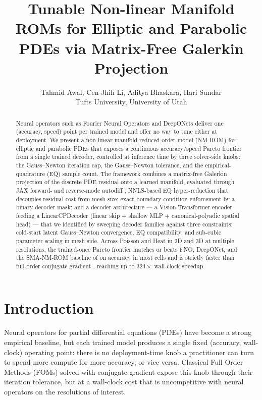 \documentclass{article}
\title{Tunable Non-linear Manifold ROMs for Elliptic and Parabolic
       PDEs via Matrix-Free Galerkin Projection}
\author{%
  Tahmid Awal, Cen-Jhih Li, Aditya Bhaskara, Hari Sundar \\
  Tufts University, University of Utah \\
}
\begin{document}
\maketitle

\begin{abstract}

Neural operators such as Fourier Neural Operators
\citep{Li2020FNO} and DeepONets \citep{Lu2021DeepONet} deliver one
(accuracy, speed) point per trained model and offer no way to tune
either at deployment. We present a non-linear manifold reduced order
model (NM-ROM) for elliptic and parabolic PDEs that exposes a
continuous accuracy/speed Pareto frontier from a single trained
decoder, controlled at inference time by three solver-side knobs: the
Gauss--Newton iteration cap, the Gauss--Newton tolerance, and the
empirical-quadrature (EQ) sample count. The framework combines a
matrix-free Galerkin projection of the discrete PDE residual onto a
learned manifold, evaluated through JAX
forward- and reverse-mode autodiff \citep{Bradbury2018JAX}; NNLS-based
\citep{LawsonHanson1974NNLS} EQ hyper-reduction
\citep{Hernandez2017EQ,YanoPatera2019LPEQ} that decouples residual cost
from mesh size; exact boundary condition enforcement by a binary
decoder mask; and a decoder architecture --- a Vision Transformer
encoder \citep{Dosovitskiy2021ViT,Vaswani2017Attention} feeding a
LinearCPDecoder \citep{KoldaBader2009CP} (linear skip + shallow MLP +
canonical-polyadic spatial head) --- that we identified by sweeping
decoder families against three constraints: cold-start latent
Gauss--Newton convergence, EQ compatibility, and sub-cubic parameter
scaling in mesh side. Across Poisson and Heat in 2D and 3D at multiple
resolutions, the trained-once Pareto frontier matches or beats FNO,
DeepONet, and the SMA-NM-ROM baseline of \citet{KimChoi2022NMROM} on
accuracy in most cells and is strictly faster than full-order
conjugate gradient \citep{HestenesStiefel1952CG}, reaching up to
$324\times$ wall-clock speedup.

\end{abstract}

\section{Introduction}
\label{sec:intro}

Neural operators for partial differential equations (PDEs)
\citep{Li2020FNO,Lu2021DeepONet,Kovachki2023NeuralOperator,Li2024PINO,BoulleTownsend2024} have
become a strong empirical baseline, but each trained model produces a
single fixed (accuracy, wall-clock) operating point: there is no
deployment-time knob a practitioner can turn to spend more compute for
more accuracy, or vice versa. Classical Full Order Methods (FOMs)
\citep{Hughes2000FEM} solved with conjugate gradient
\citep{HestenesStiefel1952CG} expose this knob through their iteration
tolerance, but at a wall-clock cost that is uncompetitive with neural
operators on the resolutions of interest.
\end{document}
